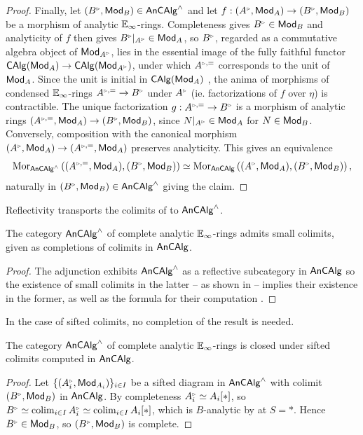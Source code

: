 \begin{proof}
    Finally, let $(B^{\tri},\Mod_{B})\in\An\CAlg^{\wedge}$ and let $f:(A^{\tri},\Mod_{A})\to(B^{\tri},\Mod_{B})$ be a morphism of analytic $\mathbb{E}_{\infty}$-rings. Completeness gives $B^{\tri}\in\Mod_{B}$ and analyticity of $f$ then gives $B^{\tri}|_{A^{\tri}}\in\Mod_{A}$, so $B^{\tri}$, regarded as a commutative algebra object of $\Mod_{A^{\tri}}$, lies in the essential image of the fully faithful functor $\CAlg(\Mod_{A})\to\CAlg(\Mod_{A^{\tri}})$, under which $A^{\tri,=}$ corresponds to the unit of $\mathsf{Mod}_{A}$. Since the unit is initial in $\mathsf{CAlg}(\mathsf{Mod}_{A})$ \cite[Cor. 3.2.1.9]{HA}, the anima of morphisms of condensed $\mathbb{E}_{\infty}$-rings $A^{\tri,=}\to B^{\tri}$ under $A^{\tri}$ (ie. factorizations of $f$ over $\eta$) is contractible. The unique factorization $g:A^{\tri,=}\to B^{\tri}$ is a morphism of analytic rings $(A^{\tri,=},\Mod_{A})\to(B^{\tri},\Mod_{B})$, since $N|_{A^{\tri}}\in\Mod_{A}$ for $N\in\mathsf{Mod}_{B}$. Conversely, composition with the canonical morphism $(A^{\tri},\Mod_{A})\to(A^{\tri,=},\Mod_{A})$ preserves analyticity. This gives an equivalence 
    $$\Mor_{\An\CAlg^{\wedge}}\left((A^{\tri,=},\Mod_{A}),(B^{\tri},\Mod_{B})\right)\simeq\Mor_{\An\CAlg}\left((A^{\tri},\Mod_{A}),(B^{\tri},\Mod_{B})\right),$$
    naturally in $(B^{\tri},\Mod_{B})\in\An\CAlg^{\wedge}$ giving the claim. 
\end{proof}
Reflectivity transports the colimits of  to $\mathsf{An}\mathsf{CAlg}^{\wedge}$.
\begin{corollary}\label{cor: complete AnCAlg has colimits}
    The category $\mathsf{An}\mathsf{CAlg}^{\wedge}$ of complete analytic $\mathbb{E}_{\infty}$-rings admits small colimits, given as completions of colimits in $\mathsf{An}\mathsf{CAlg}$.  
\end{corollary}
\begin{proof}
    The adjunction exhibits $\mathsf{An}\mathsf{CAlg}^{\wedge}$ as a reflective subcategory in $\mathsf{An}\mathsf{CAlg}$ so the existence of small colimits in the latter -- as shown in  -- implies their existence in the former, as well as the formula for their computation \cite[\href{https://kerodon.net/tag/04JW}{Tag 04JW}]{kerodon}. 
\end{proof}
In the case of sifted colimits, no completion of the result is needed. 
\begin{proposition}\label{prop: sifted colimits in complete}
    The category $\mathsf{An}\mathsf{CAlg}^{\wedge}$ of complete analytic $\mathbb{E}_{\infty}$-rings is closed under sifted colimits computed in $\mathsf{An}\mathsf{CAlg}$. 
\end{proposition}
\begin{proof}
    Let $\{(A_{i}^{\tri},\Mod_{A_{i}})\}_{i\in I}$ be a sifted diagram in $\mathsf{An}\mathsf{CAlg}^{\wedge}$ with colimit $(B^{\tri},\Mod_{B})$ in $\mathsf{An}\mathsf{CAlg}$. By completeness $A_{i}^{\tri}\simeq A_{i}[*]$, so $B^{\tri}\simeq\colim_{i\in I}A_{i}^{\tri}\simeq\colim_{i\in I}A_{i}[*]$, which is $B$-analytic by  at $S=*$. Hence $B^{\tri}\in\Mod_{B}$, so $(B^{\tri},\Mod_{B})$ is complete. 
\end{proof}
